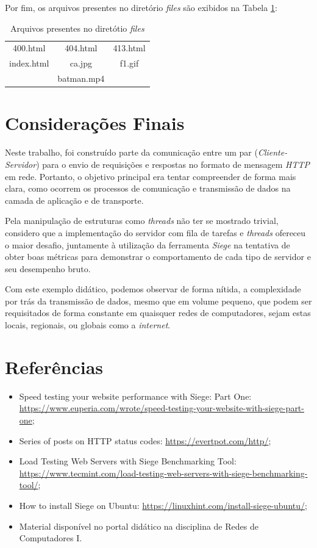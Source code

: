 \documentclass[a4paper, 12pt]{article}
\begin{document}
\begin{center}
\end{center}

\noindent Por fim, os arquivos presentes no diretório \emph{files} são exibidos na Tabela \ref{tab:exampleTab2}:
\begin{table}[H]
    \centering
    \caption{Arquivos presentes no diretótio \emph{files}}\vspace{0.3cm}
    \label{tab:exampleTab2}
    \begin{tabular}{c|c|c}
     400.html & 404.html & 413.html\\
     index.html & ca.jpg & f1.gif\\
     & batman.mp4 &
    \end{tabular}
\end{table}

\section{Considerações Finais}

Neste trabalho, foi construído parte da comunicação entre um par (\emph{Cliente-Servidor}) para o envio de requisições e respostas no formato de mensagem \emph{HTTP} em rede. Portanto, o objetivo principal era tentar compreender de forma mais clara, como ocorrem os processos de comunicação e transmissão de dados na camada de aplicação e de transporte. 

Pela manipulação de estruturas como \emph{threads} não ter se mostrado trivial, considero que a implementação do servidor com fila de tarefas e \emph{threads} ofereceu o maior desafio, juntamente à utilização da ferramenta \emph{Siege} na tentativa de obter boas métricas para demonstrar o comportamento de cada tipo de servidor e seu desempenho bruto.

Com este exemplo didático, podemos observar de forma nítida, a complexidade por trás da transmissão de dados, mesmo que em volume pequeno, que podem ser requisitados de forma constante em quaisquer redes de computadores, sejam estas locais, regionais, ou globais como a \emph{internet}. 

\section*{Referências}

\begin{itemize}
    \item Speed testing your website performance with Siege: Part One: \url{https://www.euperia.com/wrote/speed-testing-your-website-with-siege-part-one};
    \item Series of posts on HTTP status codes: \url{https://evertpot.com/http/};
    \item Load Testing Web Servers with Siege Benchmarking Tool: \url{https://www.tecmint.com/load-testing-web-servers-with-siege-benchmarking-tool/};
    \item How to install Siege on Ubuntu: \url{https://linuxhint.com/install-siege-ubuntu/};
    \item Material disponível no portal didático na disciplina de Redes de Computadores I.
\end{itemize}
\end{document}
